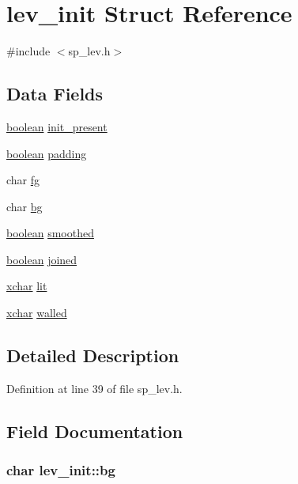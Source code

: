 \hypertarget{structlev__init}{\section{lev\+\_\+init Struct Reference}
\label{structlev__init}
}


{\ttfamily \#include $<$sp\+\_\+lev.\+h$>$}

\subsection*{Data Fields}
\begin{DoxyCompactItemize}
\item 
\hyperlink{global_8h_a531b10dd351aa162d7dcccd1966308b8}{boolean} \hyperlink{structlev__init_a3f0200a1efa4d4f3f16260524839036e}{init\+\_\+present}
\item 
\hyperlink{global_8h_a531b10dd351aa162d7dcccd1966308b8}{boolean} \hyperlink{structlev__init_aee1cc1239553cf34115e6bfb90475075}{padding}
\item 
char \hyperlink{structlev__init_af05a7a24000bcbe833283f9f64e4f96f}{fg}
\item 
char \hyperlink{structlev__init_abbc5f70883616b1d6f75ef6aa1cbc3c4}{bg}
\item 
\hyperlink{global_8h_a531b10dd351aa162d7dcccd1966308b8}{boolean} \hyperlink{structlev__init_acc2766b536116ec0723576ca282449dd}{smoothed}
\item 
\hyperlink{global_8h_a531b10dd351aa162d7dcccd1966308b8}{boolean} \hyperlink{structlev__init_af7653a4a64cf753edc423d2ea2734a8d}{joined}
\item 
\hyperlink{global_8h_a2043b7d01ce89f4ee2fa6c345a752d32}{xchar} \hyperlink{structlev__init_a9b5482cd068d4e4c5c2a1277487cea9a}{lit}
\item 
\hyperlink{global_8h_a2043b7d01ce89f4ee2fa6c345a752d32}{xchar} \hyperlink{structlev__init_a97254371d5b19966ba23b3a65a085ef8}{walled}
\end{DoxyCompactItemize}


\subsection{Detailed Description}


Definition at line 39 of file sp\+\_\+lev.\+h.



\subsection{Field Documentation}
\hypertarget{structlev__init_abbc5f70883616b1d6f75ef6aa1cbc3c4}{
\subsubsection[{bg}]{\setlength{\rightskip}{0pt plus 5cm}char lev\+\_\+init\+::bg}}\label{structlev__init_abbc5f70883616b1d6f75ef6aa1cbc3c4}


